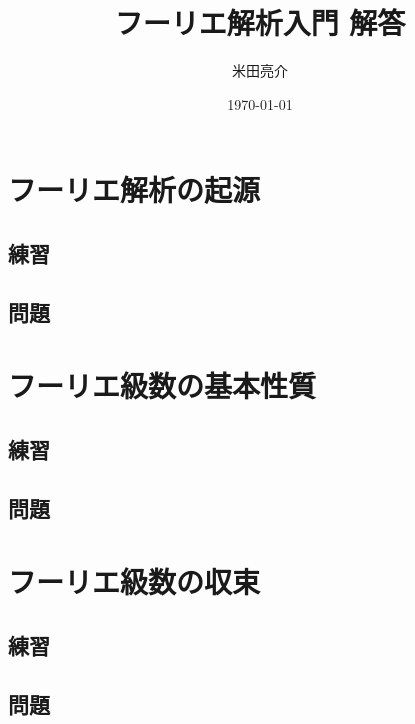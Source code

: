 \documentclass[platex]{jsarticle}
\begin{document}
\title{フーリエ解析入門 解答}
\author{米田亮介}
\date{\today}
\maketitle

\tableofcontents

\newpage
\section{フーリエ解析の起源}
\setcounter{subsection}{2}
\subsection{練習}












\subsection{問題}

\newpage
\section{フーリエ級数の基本性質}
\setcounter{subsection}{5}
\subsection{練習}



\subsection{問題}

\newpage
\section{フーリエ級数の収束}
\setcounter{subsection}{2}
\subsection{練習}
\subsection{問題}
\end{document}
